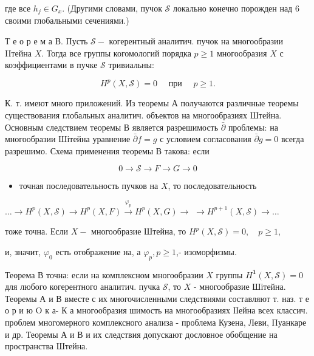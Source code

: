 \documentclass[10pt]{article}
\begin{document}
где все $h_{j} \in G_{x}$. (Другими словами, пучок $\mathscr{S}$ локально конечно порожден над 6 своими глобальными сечениями.)



Т е о р е м а В. Пусть $\mathscr{S}-$ когерентный аналитич. пучок на многообразии IIтейна $X$. Тогда все группы когомологий порядка $p \geqslant 1$ многообразия $X$ с коэффициентами в пучке $\mathscr{S}$ тривиальны:



\[

H^{p}(X, \mathscr{S})=0 \quad \text { при } \quad p \geqslant 1 .

\]



К. т. имеют много приложений. Из теоремы А получаются различные теоремы существования глобальных аналитич. объектов на многообразиях Штейна. Основным следствием теоремы В является разрешимость $\bar{\partial}$ проблемы: на многообразии Шітейна уравнение $\bar{\partial} f=g$ с условием согласования $\bar{\partial} g=0$ всегда разрешимо. Схема применения теоремы В такова: если



\[

0 \longrightarrow \mathscr{S} \longrightarrow F \longrightarrow G \longrightarrow 0

\]



\begin{itemize}

  \item точная последовательность пучков на $X$, то последовательность

\end{itemize}



$\ldots \longrightarrow H^{p}(X, \mathscr{S}) \longrightarrow H^{p}(X, F) \stackrel{\varphi_{p}}{\longrightarrow} H^{p}(X, G) \longrightarrow$ $\longrightarrow H^{p+1}(X, \mathscr{S}) \longrightarrow \ldots$



тоже точна. Если $X-$ многообразие Штейна, то $H^{p}(X, \mathscr{S})=0, \quad p \geqslant 1$,



и, значит, $\varphi_{0}$ есть отображение на, а $\varphi_{p}, p \geqslant 1$,- изоморфизмы.



Теорема В точна: если на комплексном многообразии $X$ группы $H^{\mathbf{1}}(X, \mathscr{S})=0$ для любого когерентного аналитич. пучка $\mathscr{S}$, то $X$ - многообразие Шітейна. Теоремы А и В вместе с их многочисленными следствиями составляют т. наз. т е о р и ю $\mathrm{O}$ к а- К а многообразия шимость на многообразиях ІІейна всех классич. проблем многомерного комплексного анализа - проблема Кузена, Леви, Пуанкаре и др. Теоремы А и В и их следствия допускают дословное обобщение на пространства Штейна.
\end{document}
